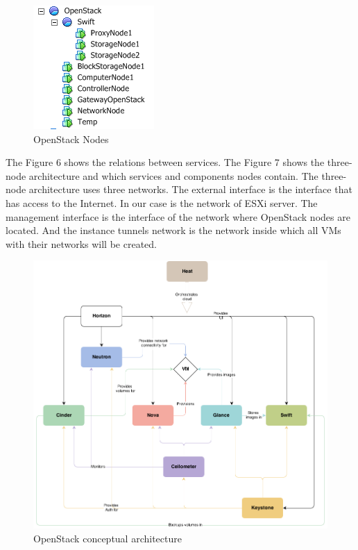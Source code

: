 \begin{figure}[ht!]
\centering
\includegraphics{openstack_tree.png}
\caption{OpenStack Nodes}
\label{overflow}
\end{figure}

The Figure 6 shows the relations between services. The Figure 7 shows the three-node architecture and which services and components nodes contain. The three-node  architecture uses three networks. The external interface is the interface that has access to the Internet. In our case is the network of ESXi server. The management interface is the interface of the network where OpenStack nodes are located. And the instance tunnels network is the network inside which all VMs with their networks will be created. 




\begin{figure}[ht!]
\centering
\includegraphics[width=\textwidth]{openstack_conceptual_architecture.png}
\caption{OpenStack conceptual architecture}
\label{overflow}
\end{figure}


